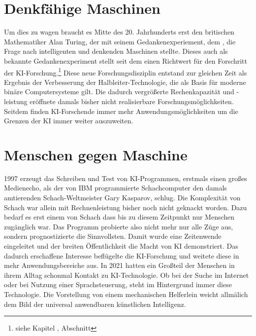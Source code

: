 \documentclass[12pt,german,ngerman]{report}
\begin{document}
    \section{Denkfähige Maschinen}
        Um dies zu wagen braucht es Mitte des 20. Jahrhunderts erst den britischen Mathematiker Alan Turing, 
        der mit seinem Gedankenexperiement, dem , 
        die Frage nach intelligenten und denkenden Maschinen stellte.
        Dieses auch als  bekannte Gedankenexperiment stellt seit dem einen 
        Richtwert für den Forschritt der KI-Forschung.\footnote{siehe Kapitel , Abschnitt }
        Diese neue Forschungsdisziplin entstand zur gleichen Zeit als Ergebnis 
        der Verbesserung der Halbleiter-Technologie, die als Basis für 
        moderne binäre Computersysteme gilt. Die dadurch vergrößerte Rechenkapazität und -leistung 
        eröffnete damals bisher nicht realisierbare Forschungsmöglichkeiten. 
        Seitdem finden KI-Forschende immer mehr Anwendungsmöglichkeiten um die Grenzen der KI immer weiter auszuweiten.
    
    \section{Menschen gegen Maschine}
        1997 erzeugt das Schreiben und Test von KI-Programmen, erstmals einen großes Medienecho, 
        als der von IBM programmierte Schachcomputer
         den damals amtierenden Schach-Weltmeister Gary Kasparov, schlug.\cite{chessbase2017kasparovdeepblue} 
        Die Komplexität von Schach war allein mit 
        Rechnenleistung bisher noch nicht geknackt worden. Dazu bedarf es erst einem  von Schach dass bis zu diesem
        Zeitpunkt nur Menschen zugänglich war. Das Programm probierte also nicht mehr nur alle Züge aus, sondern prognostizierte die 
        Sinnvollsten. Damit wurde eine Zeitenwende eingeleitet und der breiten Öffentlichkeit die Macht von KI demonstriert.
        Das dadurch erschaffene Interesse beflügelte die KI-Forschung und weitete diese in mehr Anwendungsbereiche aus.
        In 2021 hatten ein Großteil der Menschen in ihrem Alltag schonmal Kontakt zu KI-Technologie. 
        Ob bei der Suche im Internet oder bei Nutzung einer Sprachsteuerung, steht im Hintergrund immer diese Technologie.
        Die Vorstellung von einem mechanischen Helferlein weicht allmälich dem Bild der universal anwendbaren künstlichen Intelligenz.
        
\end{document}
